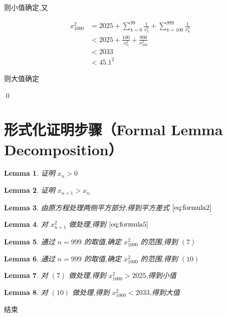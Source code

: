 \documentclass[11pt]{article}
\newtheorem{lemma}{Lemma}
\begin{document}
则小值确定,又

\begin{align}
x_{1000}^2 & = 2025 + \sum_{k=0}^{99}\frac{1}{x_k^2} + \sum_{k=100}^{999}\frac{1}{x_k^2} \\
& < 2025 + \frac{100}{x_0^2} + \frac{900}{x_{100}^2} \\
& < 2033 \\ 
& < 45.1^2
\end{align}

则大值确定

\qed


\section*{形式化证明步骤（Formal Lemma Decomposition）}

\begin{lemma}
    证明 $x_n > 0$
\end{lemma}

\begin{lemma}
    证明 $x_{n+1} > x_n$
\end{lemma}

\begin{lemma}
    由原方程处理两侧平方部分,得到平方差式 $\eqref{eq:formula2}$
\end{lemma}

\begin{lemma}
    对 $x_{n+1}^2$ 做处理,得到 $\eqref{eq:formula5}$
\end{lemma}

\begin{lemma}
    通过 $n=999$ 的取值,确定 $x_{1000}^2$ 的范围,得到 $(7)$
\end{lemma}

\begin{lemma}
    通过 $n=999$ 的取值,确定 $x_{1000}^2$ 的范围,得到 $(10)$
\end{lemma}

\begin{lemma}
    对 $(7)$ 做处理,得到 $x_{1000}^2 > 2025$,得到小值
\end{lemma}

\begin{lemma}
    对 $(10)$ 做处理,得到 $x_{1000}^2 < 2033$,得到大值
\end{lemma}

结束
\end{document}
